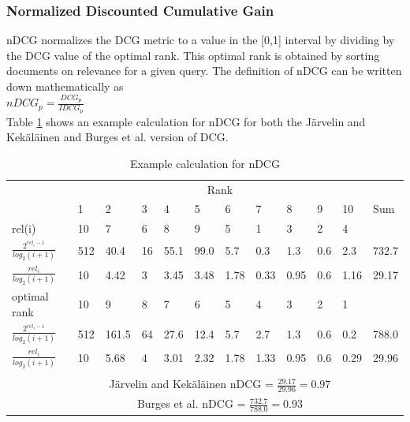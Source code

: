 \subsubsection{Normalized Discounted Cumulative Gain}
\ac{nDCG} normalizes the \ac{DCG} metric to a value in the [0,1] interval by dividing by the \ac{DCG} value of the optimal rank. This optimal rank is obtained by sorting documents on relevance for a given query. The definition of \ac{nDCG} can be written down mathematically as\\

$nDCG_p = \frac{DCG_p}{IDCG_p}$\\

Table \ref{tab:example_calculation_nDCG} shows an example calculation for \ac{nDCG} for both the J{\"a}rvelin and Kek{\"a}l{\"a}inen \cite{Jarvelin2002} and Burges et al. \cite{Burges2005} version of \ac{DCG}.

\begin{table}[!h]
\begin{tabular}{llllllllllll}
 & \multicolumn{10}{c}{Rank} &  \\ 
\cline{2-11}
 & 1 & 2 & 3 & 4 & 5 & 6 & 7 & 8 & 9 & 10 & Sum \\ 
\hline
\hline
rel(i) & 10 & 7 & 6 & 8 & 9 & 5 & 1 & 3 & 2 & 4 &  \\
\hline
$\frac{2^{rel_i-1}}{log_2(i+1)}$ & 512 & 40.4 & 16 & 55.1 & 99.0 & 5.7 & 0.3 & 1.3 & 0.6 & 2.3 & 732.7 \\
\hline
$\frac{rel_i}{log_2(i+1)}$ & 10 & 4.42 & 3 & 3.45 & 3.48 & 1.78 & 0.33 & 0.95 & 0.6 & 1.16 & 29.17 \\  
\hline
\hline
optimal rank & 10 & 9 & 8 & 7 & 6 & 5 & 4 & 3 & 2 & 1 &  \\
\hline 
$\frac{2^{rel_i-1}}{log_2(i+1)}$ & 512 & 161.5 & 64 & 27.6 & 12.4 & 5.7 & 2.7 & 1.3 & 0.6 & 0.2 & 788.0 \\
\hline
$\frac{rel_i}{log_2(i+1)}$ & 10 & 5.68 & 4 & 3.01 & 2.32 & 1.78 & 1.33 & 0.95 & 0.6 & 0.29 & 29.96 \\   
\hline
 &  &  &  &  &  &  &  &  &  &  &  \\
 & \multicolumn{10}{c}{J{\"a}rvelin and Kek{\"a}l{\"a}inen \cite{Jarvelin2002} \ac{nDCG} = $\frac{29.17}{29.96} = 0.97$} &  \\  
 & \multicolumn{10}{c}{Burges \cite{Burges2005} et al. \ac{nDCG} = $\frac{732.7}{788.0} = 0.93$} &  \\ 
\end{tabular}
\caption{Example calculation for \ac{nDCG}}
\label{tab:example_calculation_nDCG}
\end{table}

